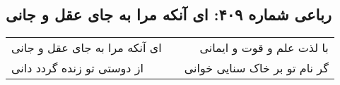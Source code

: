 \begin{center}
\section*{رباعی شماره ۴۰۹: ای آنکه مرا به جای عقل و جانی}
\label{sec:sh409}
\begin{longtable}{l p{0.5cm} r}
ای آنکه مرا به جای عقل و جانی
&&
با لذت علم و قوت و ایمانی
\\
از دوستی تو زنده گردد دانی
&&
گر نام تو بر خاک سنایی خوانی
\\
\end{longtable}
\end{center}
